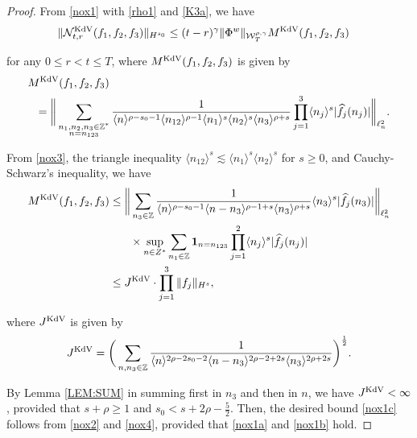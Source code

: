 \documentclass[letterpaper, 11pt,  reqno]{amsart}
\newcommand{\1}{\hspace{0.5mm}\text{I}\hspace{0.5mm}}
\newcommand{\noi}{\noindent}
\newcommand{\Z}{\mathbb{Z}}
\newcommand{\g}{\gamma}
\newcommand{\ft}{\widehat}
\renewcommand{\l}{\ell}
\newcommand{\les}{\lesssim}
\newcommand{\jb}[1]
{\langle #1 \rangle}
\newcommand{\ind}{\mathbf 1}
\newcommand{\NN}{\mathcal{N}}
\newcommand{\W}{\mathcal{W}}
\newcommand{\KDV}{\text{\rm KdV} }
\numberwithin{equation}{section}
\numberwithin{theorem}{section}
\begin{document}
\begin{proof}%

From \eqref{nox1} with \eqref{rho1} and \eqref{K3a}, we have
\begin{align}
 \| \NN^\KDV_{t, r}(f_1, f_2, f_3)\|_{H^{s_0}}
&  \le
(t- r)^\g \|\Phi^w\|_{  \W^{\rho,\g}_T}M^\KDV(f_1, f_2, f_3)
\label{nox2}
\end{align}

\noi
for any $0 \le r < t \le T$, 
where $M^\KDV(f_1, f_2, f_3)$ is given by 
\begin{align}
\begin{split}
& M^\KDV(f_1, f_2, f_3)\\
& \ \  =\bigg\|
\sum_{\substack{n_1, n_2, n_3 \in \Z^*\\n = n_{123}}}
\frac{1}{\jb{n}^{\rho-s_0 - 1}
\jb{n_{12}}^{\rho-1}
\jb{n_1}^{s}\jb{n_2}^{s}\jb{n_3}^{\rho+s}} 
\prod_{j = 1}^3\jb{n_j}^s|\ft f_j(n_j)|
\bigg\|_{\l^2_n}.
\end{split}
\label{nox3}
\end{align}




From \eqref{nox3}, the triangle inequality $\jb{n_{12}}^s \les \jb{n_1}^s\jb{n_2}^s$
for $s \ge 0$, and Cauchy-Schwarz's inequality, we have 
\begin{align}
\begin{split}
 M^\KDV(f_1, f_2, f_3)
&   \le \bigg\|
\sum_{ n_3 \in \Z}
\frac{1}{\jb{n}^{\rho-s_0 - 1}
\jb{n - n_3}^{\rho-1+s}
\jb{n_3}^{\rho+s}} 
\jb{n_3}^s|\ft f_j(n_3)|\bigg\|_{\l^2_n}\\
 & \hphantom{XX} \times 
\sup_{n \in Z^*}\sum_{ n_1 \in \Z}
\ind_{n = n_{123}}
\prod_{j = 1}^2
\jb{n_j}^s|\ft f_j(n_j)|
\\
& 
\le 
 J^\KDV\cdot \prod_{j = 1}^3\|f_j\|_{H^s}, 
\end{split}
\label{nox4}
\end{align}


\noi
where  $ J^\KDV$ is given by 
\begin{align*}
 J^\KDV
= \bigg(\sum_{n,  n_3 \in \Z}
\frac{1}{\jb{n}^{2\rho-2s_0 - 2}
\jb{n - n_3}^{2\rho-2+2s}
\jb{n_3}^{2\rho+2s}} 
\bigg)^\frac 12.
\end{align*}

\noi
By
Lemma \ref{LEM:SUM}
in summing first in $n_3$ and then in $n$, we have $J^\KDV < \infty$, 
\noi
provided that 
$s + \rho  \ge 1$ and $s_0 < s + 2\rho - \frac 52$.
Then, the desired bound \eqref{nox1c} follows
from \eqref{nox2} and \eqref{nox4},  
provided that \eqref{nox1a}
and \eqref{nox1b}
hold.
\end{proof}
\end{document}
